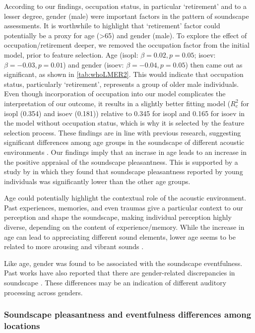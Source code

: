 According to our findings, occupation status, in particular `retirement' and to a lesser degree, gender (male) were important factors in the pattern of soundscape assessments. It is worthwhile to highlight that `retirement' factor could potentially be a proxy for age (>65) and gender (male). To explore the effect of occupation/retirement deeper, we removed the occupation factor from the initial model, prior to feature selection. Age (\gls{isopl}: $\beta=0.02, p=0.05$; \gls{isoev}: $\beta=-0.03, p=0.01$) and gender (\gls{isoev}: $\beta=-0.04, p=0.05$) then came out as significant, as shown in \cref{tab:whoLMER2}. This would indicate that occupation status, particularly `retirement', represents a group of older male individuals. Even though incorporation of occupation into our model complicates the interpretation of our outcome, it results in a slightly better fitting model ($R^2_c$ for \gls{isopl} (0.354) and \gls{isoev} (0.181)) relative to 0.345 for \gls{isopl} and 0.165 for \gls{isoev} in the model without occupation status, which is why it is selected by the feature selection process. These findings are in line with previous research, suggesting significant differences among age groups in the soundscape of different acoustic environments \citep{Ren2016Soundscape,Yang2005Acoustic}. Our findings imply that an incrase in age leads to an increase in the positive appraisal of the soundscape pleasantness. This is supported by a study by \citet{Aydin2016Assessment} in which they found that soundscape pleasantness reported by young individuals was significantly lower than the other age groups. 

Age could potentially highlight the contextual role of the acoustic environment. Past experiences, memories, and even traumas give a particular context to our perception and shape the soundscape, making individual perception highly diverse, depending on the content of experience/memory. While the increase in age can lead to appreciating different sound elements, lower age seems to be related to more arousing and vibrant sounds \citep{Yang2005Acoustic}.

Like age, gender was found to be associated with the soundscape eventfulness. Past works have also reported that there are gender-related discrepancies in soundscape \citep{Croome1977Noise,Yang2005Acoustic}. These differences may be an indication of different auditory processing across genders.

\subsubsection*{Soundscape pleasantness and eventfulness differences among locations}

